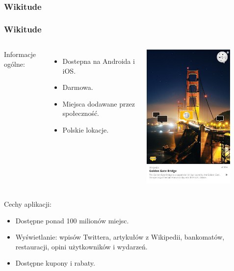 \subsubsection{Wikitude}
\begin{frame}[allowframebreaks]
\frametitle{Wikitude}

\begin{columns}
Informacje ogólne: 
\begin{itemize}
\item Dostepna na Androida i iOS.
\item Darmowa.
\item Miejsca dodawane przez społeczność.
\item Polskie lokacje.
\end{itemize}
\includegraphics[width=0.8\textwidth]{wikitude}
\end{columns}

\framebreak

Cechy aplikacji:
\begin{itemize}
\item Dostępne ponad 100 milionów miejsc.
\item Wyświetlanie: wpisów Twittera, artykułów z Wikipedii, bankomatów,
    restauracji, opini użytkowników i wydarzeń.
\item Dostępne kupony i rabaty.
\end{itemize}

\end{frame}
